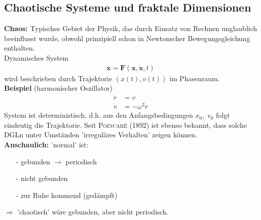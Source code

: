 \documentclass[12pt]{article}
\begin{document}
\subsection{Chaotische Systeme und fraktale Dimensionen}
\textbf{Chaos:} Typisches Gebiet der Physik, das durch Einsatz von Rechnen unglaublich %
beeinflusst wurde, obwohl prinzipiell schon in Newtonscher Bewegungsgleichung enthalten. \\
Dynamisches System
\begin{align*}
\ddot{\mathbf{x}} = \mathbf{F} (\mathbf{x}, \mathbf{\dot{x}}, t)
\end{align*}
wird beschrieben durch Trajektorie $(x(t), v(t))$ im Phasenraum. \\
\textbf{Beispiel} (harmonischer Oszillator)
\begin{align*}
\dot{r} &= v \\
\dot{v} &= - \omega^2 r
\end{align*}
System ist deterministisch, d.h. aus den Anfangsbedingungen $x_0, \; v_0$ folgt eindeutig die Trajektorie. Seit \textsc{Poincaré} (1892) ist ebenso bekannt, dass solche DGLn unter Umständen 'irreguläres Verhalten' zeigen können. \\
\textbf{Anschaulich:} 'normal' ist:
\begin{itemize}
\item[-] gebunden $\to$ periodisch
\item[-] nicht gebunden
\item[-] zur Ruhe kommend (gedämpft)
\end{itemize}
$\Rightarrow$ 'chaotisch' wäre gebunden, aber nicht periodisch. \\
\end{document}
